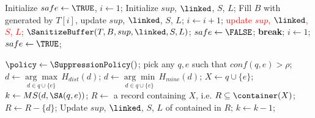 \begin{algorithm}[th]
\caption{$\PartialSuppressor(T, D_S, \rho, \bmax)$}
\label{algo:partialsuppressor}
\begin{algorithmic}[1]
    \STATE Initialize $safe\leftarrow\TRUE$, $i\leftarrow 1$;
    \LOOP
        \STATE Initialize $sup$, $\linked$, $S$, $L$;
         \label{algo:enu_s}
             \STATE Fill $B$ with \qids generated by $T[i]$, \label{algo:enumerate1}
             \STATE update $sup$, $\linked$, $S$, $L$; \label{algo:enumerate2}
             \STATE $i\leftarrow i+1$;
        \ENDWHILE \label{algo:enu_e}
		\STATE \textcolor{red}{update $sup$, $\linked$, $S$, $L$;}
        \label{line:containunsafe}
            \STATE $\SanitizeBuffer(T, B, sup, \linked, S, L)$;\label{line:sanitizebuffer}
            \STATE $safe\leftarrow\FALSE$;
        \ENDIF
            \STATE \textbf{break};\label{algo:partialbreak}
                \STATE $i\leftarrow 1$;
                \STATE $safe\leftarrow\TRUE$;
        \ENDIF
    \ENDLOOP
\end{algorithmic}
\end{algorithm}

\begin{algorithm}[th]
\caption{$\SanitizeBuffer(T, B, sup, \linked, S, L)$}
\label{algo:sanitize}
\begin{algorithmic}[1]
\STATE $\policy \leftarrow \SuppressionPolicy()$; \label{choose_heur}
\REPEAT
\label{algo:pick_rs}
    \STATE pick any $q,e$ such that $conf(q,e)>\rho$;
        \STATE $d\gets\underset{d\in q\cup\{e\}}{\arg\max}\,H_{dist}(d)$;
        \label{algo:heur_dist}
    \ELSE
        \STATE $d\gets\underset{d\in q\cup\{e\}}{\arg\min}\,H_{mine}(d)$;
        \label{algo:heur_mine}
    \ENDIF
    \STATE $X\leftarrow q\cup\{e\}$;
    \STATE $k\leftarrow MS(d,\SA(q,e))$;\label{line:sanitize-k}
    \label{line:sanitize-whilek}
        \STATE $R\leftarrow$ a record containing $X$, i.e. $R\subseteq
        \container(X)$;
        \label{pick_row}
        \STATE $R\leftarrow R-\{d\}$;\label{line:sanitize-suppress}
        \STATE Update $sup$, $\linked$, $S$, $L$ of \qids contained in $R$;
        \label{algo:update_kl}
        \STATE $k \leftarrow k-1$;
    \ENDWHILE
{}   \label{algo:pick_re}
\end{algorithmic}
\end{algorithm}


